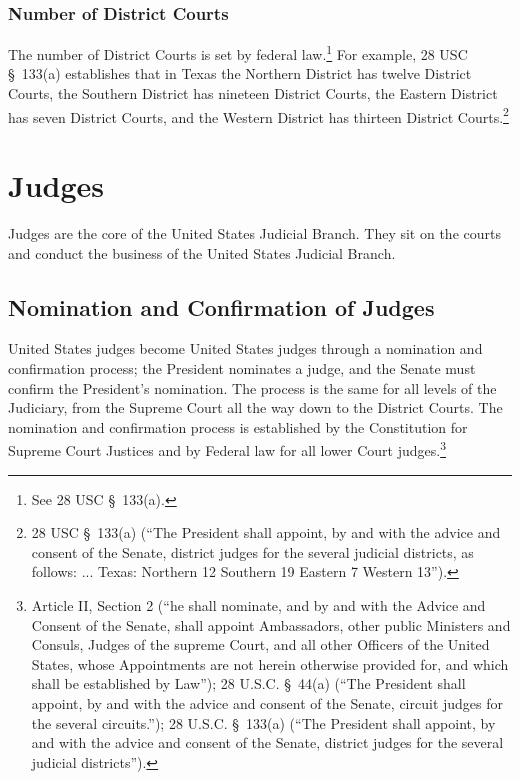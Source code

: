 \subsubsection{Number of District Courts}
The number of District Courts is set by federal law.\footnote{See 28 USC \S\ 133(a).}  For example, 28 USC \S\ 133(a) establishes that in Texas the Northern District has twelve District Courts, the Southern District has nineteen District Courts, the Eastern District has seven District Courts, and the Western District has thirteen District Courts.\footnote{28 USC \S\ 133(a) (``The President shall appoint, by and with the advice and consent of the Senate, district judges for the several judicial districts, as follows: ... Texas: Northern 12 Southern 19  Eastern 7 Western 13'').}






\section{Judges}
Judges are the core of the United States Judicial Branch.  They sit on the courts and conduct the business of the United States Judicial Branch.  


\subsection{Nomination and Confirmation of Judges}
United States judges become United States judges through a nomination and confirmation process; the President nominates a judge, and the Senate must confirm the President's nomination.  The process is the same for all levels of the Judiciary, from the Supreme Court all the way down to the District Courts.  The nomination and confirmation process is established by the Constitution for Supreme Court Justices and by Federal law for all lower Court judges.\footnote{Article II, Section 2 (``he shall nominate, and by and with the Advice and Consent of the Senate, shall appoint Ambassadors, other public Ministers and Consuls, Judges of the supreme Court, and all other Officers of the United States, whose Appointments are not herein otherwise provided for, and which shall be established by Law''); 28 U.S.C. \S\ 44(a) (``The President shall appoint, by and with the advice and consent of the Senate, circuit judges for the several circuits.''); 28 U.S.C. \S\ 133(a) (``The President shall appoint, by and with the advice and consent of the Senate, district judges for the several judicial districts'').}


